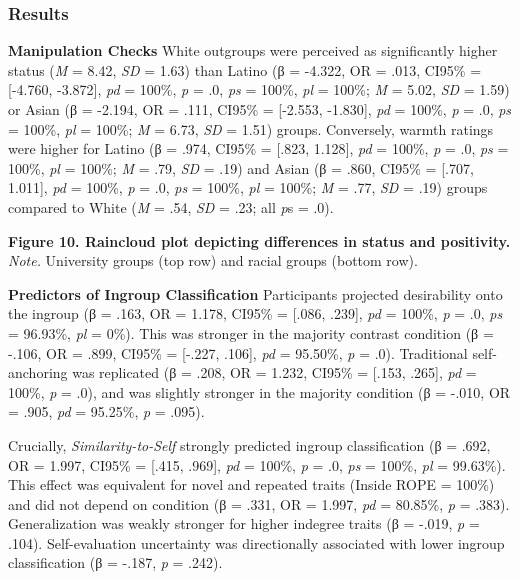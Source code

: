 \documentclass[
  man,
  longtable,
  nolmodern,
  notxfonts,
  notimes,
  man]{apa7}
\begin{document}
\subsubsection{Results}\label{results-2}

\textbf{Manipulation Checks} White outgroups were perceived as
significantly higher status (\emph{M} = 8.42, \emph{SD} = 1.63) than
Latino (β = -4.322, OR = .013, CI95\% = {[}-4.760, -3.872{]}, \emph{pd}
= 100\%, \emph{p} = .0, \emph{ps} = 100\%, \emph{pl} = 100\%; \emph{M} =
5.02, \emph{SD} = 1.59) or Asian (β = -2.194, OR = .111, CI95\% =
{[}-2.553, -1.830{]}, \emph{pd} = 100\%, \emph{p} = .0, \emph{ps} =
100\%, \emph{pl} = 100\%; \emph{M} = 6.73, \emph{SD} = 1.51) groups.
Conversely, warmth ratings were higher for Latino (β = .974, CI95\% =
{[}.823, 1.128{]}, \emph{pd} = 100\%, \emph{p} = .0, \emph{ps} = 100\%,
\emph{pl} = 100\%; \emph{M} = .79, \emph{SD} = .19) and Asian (β = .860,
CI95\% = {[}.707, 1.011{]}, \emph{pd} = 100\%, \emph{p} = .0, \emph{ps}
= 100\%, \emph{pl} = 100\%; \emph{M} = .77, \emph{SD} = .19) groups
compared to White (\emph{M} = .54, \emph{SD} = .23; all \emph{p}s = .0).

\textbf{Figure 10. Raincloud plot depicting differences in status and
positivity.} \emph{Note.} University groups (top row) and racial groups
(bottom row).

\textbf{Predictors of Ingroup Classification} Participants projected
desirability onto the ingroup (β = .163, OR = 1.178, CI95\% = {[}.086,
.239{]}, \emph{pd} = 100\%, \emph{p} = .0, \emph{ps} = 96.93\%,
\emph{pl} = 0\%). This was stronger in the majority contrast condition
(β = -.106, OR = .899, CI95\% = {[}-.227, .106{]}, \emph{pd} = 95.50\%,
\emph{p} = .0). Traditional self-anchoring was replicated (β = .208, OR
= 1.232, CI95\% = {[}.153, .265{]}, \emph{pd} = 100\%, \emph{p} = .0),
and was slightly stronger in the majority condition (β = -.010, OR =
.905, \emph{pd} = 95.25\%, \emph{p} = .095).

Crucially, \emph{Similarity-to-Self} strongly predicted ingroup
classification (β = .692, OR = 1.997, CI95\% = {[}.415, .969{]},
\emph{pd} = 100\%, \emph{p} = .0, \emph{ps} = 100\%, \emph{pl} =
99.63\%). This effect was equivalent for novel and repeated traits
(Inside ROPE = 100\%) and did not depend on condition (β = .331, OR =
1.997, \emph{pd} = 80.85\%, \emph{p} = .383). Generalization was weakly
stronger for higher indegree traits (β = -.019, \emph{p} = .104).
Self-evaluation uncertainty was directionally associated with lower
ingroup classification (β = -.187, \emph{p} = .242).
\end{document}
